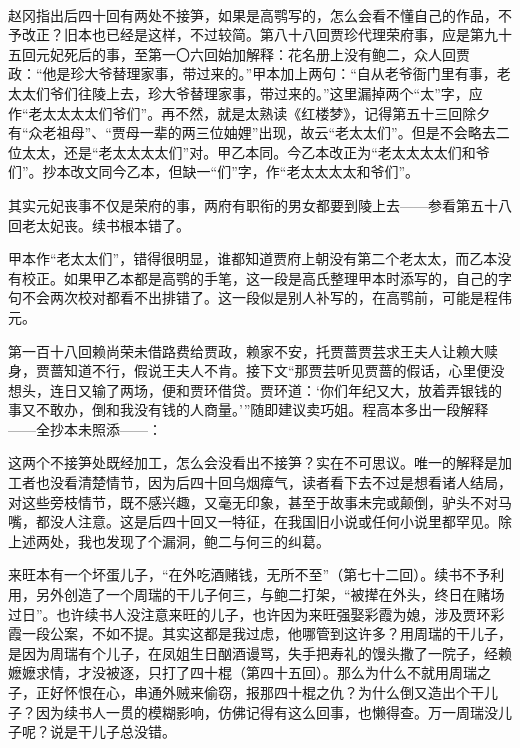 \par  
\par 赵冈指出后四十回有两处不接笋，如果是高鹗写的，怎么会看不懂自己的作品，不予改正？旧本也已经是这样，不过较简。第八十八回贾珍代理荣府事，应是第九十五回元妃死后的事，至第一〇六回始加解释：花名册上没有鲍二，众人回贾政：“他是珍大爷替理家事，带过来的。”甲本加上两句：“自从老爷衙门里有事，老太太们爷们往陵上去，珍大爷替理家事，带过来的。”这里漏掉两个“太”字，应作“老太太太太们爷们”。再不然，就是太熟读《红楼梦》，记得第五十三回除夕有“众老祖母”、“贾母一辈的两三位妯娌”出现，故云“老太太们”。但是不会略去二位太太，还是“老太太太太们”对。甲乙本同。今乙本改正为“老太太太太们和爷们”。抄本改文同今乙本，但缺一“们”字，作“老太太太太和爷们”。
\par 其实元妃丧事不仅是荣府的事，两府有职衔的男女都要到陵上去——参看第五十八回老太妃丧。续书根本错了。
\par 甲本作“老太太们”，错得很明显，谁都知道贾府上朝没有第二个老太太，而乙本没有校正。如果甲乙本都是高鹗的手笔，这一段是高氏整理甲本时添写的，自己的字句不会两次校对都看不出排错了。这一段似是别人补写的，在高鹗前，可能是程伟元。
\par 第一百十八回赖尚荣未借路费给贾政，赖家不安，托贾蔷贾芸求王夫人让赖大赎身，贾蔷知道不行，假说王夫人不肯。接下文“那贾芸听见贾蔷的假话，心里便没想头，连日又输了两场，便和贾环借贷。贾环道：‘你们年纪又大，放着弄银钱的事又不敢办，倒和我没有钱的人商量。'”随即建议卖巧姐。程高本多出一段解释——全抄本未照添——：
\par 这两个不接笋处既经加工，怎么会没看出不接笋？实在不可思议。唯一的解释是加工者也没看清楚情节，因为后四十回乌烟瘴气，读者看下去不过是想看诸人结局，对这些旁枝情节，既不感兴趣，又毫无印象，甚至于故事未完或颠倒，驴头不对马嘴，都没人注意。这是后四十回又一特征，在我国旧小说或任何小说里都罕见。除上述两处，我也发现了个漏洞，鲍二与何三的纠葛。
\par 来旺本有一个坏蛋儿子，“在外吃酒赌钱，无所不至”（第七十二回）。续书不予利用，另外创造了一个周瑞的干儿子何三，与鲍二打架，“被撵在外头，终日在赌场过日”。也许续书人没注意来旺的儿子，也许因为来旺强娶彩霞为媳，涉及贾环彩霞一段公案，不如不提。其实这都是我过虑，他哪管到这许多？用周瑞的干儿子，是因为周瑞有个儿子，在凤姐生日酗酒谩骂，失手把寿礼的馒头撒了一院子，经赖嬷嬷求情，才没被逐，只打了四十棍（第四十五回）。那么为什么不就用周瑞之子，正好怀恨在心，串通外贼来偷窃，报那四十棍之仇？为什么倒又造出个干儿子？因为续书人一贯的模糊影响，仿佛记得有这么回事，也懒得查。万一周瑞没儿子呢？说是干儿子总没错。
